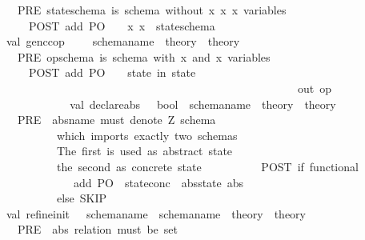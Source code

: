\begin{isabellebody}
\ \ \ \ \ \ \ {\isacharparenleft}{\isacharasterisk}\ PRE\ stateschema\ is\ schema\ without\ x{\isacharquery}{\isacharcomma}\ x{\isacharbang}{\isacharcomma}\ x{\isacharprime}\ variables{\isachardot}\isanewline
\ \ \ \ \ \ \ \ \ \ POST\ add\ PO\ \ {\isacharcolon}\ {\isasymexists}\ x{\isachardot}\ x\ {\isacharcolon}\ stateschema\ {\isacharasterisk}{\isacharparenright}\isanewline
\isanewline
\ \ \ \ \ \ val\ gen{\isacharunderscore}cc{\isacharunderscore}op\ \ \ \ {\isacharcolon}\ schema{\isacharunderscore}name\ {\isacharminus}{\isachargreater}\ theory\ {\isacharminus}{\isachargreater}\ theory\isanewline
\ \ \ \ \ \ \ {\isacharparenleft}{\isacharasterisk}\ PRE\ opschema\ is\ schema\ with\ x\ and\ x{\isacharprime}\ variables{\isachardot}\isanewline
\ \ \ \ \ \ \ \ \ \ POST\ add\ PO\ \ {\isacharcolon}\ {\isasymSforall}\ state{\isachardot}{\isasymforall}\ in{\isachardot}{\isasymSexists}\ state{\isachardot}\isanewline
\ \ \ \ \ \ \ \ \ \ \ \ \ \ \ \ \ \ \ \ \ \ \ \ \ \ \ \ \ \ \ \ \ \ \ \ \ \ \ \ \ \ \ \ \ \ \ \ \ \ \ \ \ \ \ \ \ {\isasymexists}\ out{\isachardot}\ op\ \isanewline
\ \ \ \ \ \ \ \ {\isacharasterisk}{\isacharparenright}\isanewline
\ \ \isanewline
\ \ \ \ \ \ val\ declare{\isacharunderscore}abs\ \ {\isacharcolon}\ bool\ {\isacharminus}{\isachargreater}\ schema{\isacharunderscore}name\ {\isacharminus}{\isachargreater}\ theory\ {\isacharminus}{\isachargreater}\ theory\isanewline
\ \ \ \ \ \ \ {\isacharparenleft}{\isacharasterisk}\ PRE\ \ absname\ must\ denote\ Z\ schema{\isacharcomma}\isanewline
\ \ \ \ \ \ \ \ \ \ \ \ \ \ \ which\ imports\ exactly\ two\ schemas{\isachardot}\isanewline
\ \ \ \ \ \ \ \ \ \ \ \ \ \ \ The\ first\ is\ used\ as\ abstract\ state{\isacharcomma}\isanewline
\ \ \ \ \ \ \ \ \ \ \ \ \ \ \ the\ second\ as\ concrete\ state{\isachardot}\isanewline
\ \ \ \ \ \ \ \ \ \ POST\ if\ functional{\isacharcomma}\ \isanewline
\ \ \ \ \ \ \ \ \ \ \ \ \ \ \ \ \ \ add\ PO{\isacharcolon}\ {\isachardoublequote}{\isasymSforall}\ state{\isacharunderscore}conc{\isachardot}\ {}\ abs{\isacharunderscore}state{\isachardot}\ abs{\isachardoublequote}\isanewline
\ \ \ \ \ \ \ \ \ \ \ \ \ \ \ else\ SKIP\ \isanewline
\ \ \ \ \ \ \ \ {\isacharasterisk}{\isacharparenright}\isanewline
\isanewline
\ \ \ \ \ \ val\ refine{\isacharunderscore}init\ \ {\isacharcolon}\ schema{\isacharunderscore}name\ {\isacharasterisk}\ schema{\isacharunderscore}name\ {\isacharminus}{\isachargreater}\ theory\ {\isacharminus}{\isachargreater}\ theory\isanewline
\ \ \ \ \ \ \ {\isacharparenleft}{\isacharasterisk}\ PRE\ \ abs\ relation\ must\ be\ set{\isachardot}\isanewline

\end{isabellebody}
